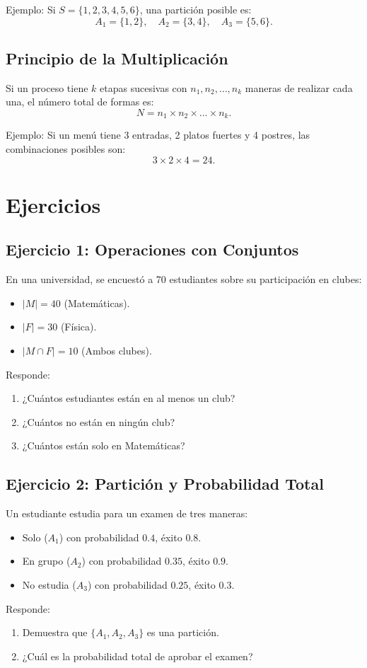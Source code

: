 \documentclass{article}
\begin{document}
	Ejemplo: Si $S = \{1,2,3,4,5,6\}$, una partición posible es:
	\[ A_1 = \{1,2\}, \quad A_2 = \{3,4\}, \quad A_3 = \{5,6\}. \]
	
	\subsection{Principio de la Multiplicación}
	Si un proceso tiene $k$ etapas sucesivas con $n_1, n_2, \dots, n_k$ maneras de realizar cada una, el número total de formas es:
	\[ N = n_1 \times n_2 \times \dots \times n_k. \]
	
	Ejemplo: Si un menú tiene 3 entradas, 2 platos fuertes y 4 postres, las combinaciones posibles son:
	\[ 3 \times 2 \times 4 = 24. \]
	
	\section{Ejercicios}
	
	\subsection{Ejercicio 1: Operaciones con Conjuntos}
	En una universidad, se encuestó a 70 estudiantes sobre su participación en clubes:
	\begin{itemize}
		\item $|M| = 40$ (Matemáticas).
		\item $|F| = 30$ (Física).
		\item $|M \cap F| = 10$ (Ambos clubes).
	\end{itemize}
	Responde:
	\begin{enumerate}
		\item ¿Cuántos estudiantes están en al menos un club?
		\item ¿Cuántos no están en ningún club?
		\item ¿Cuántos están solo en Matemáticas?
	\end{enumerate}
	
	\subsection{Ejercicio 2: Partición y Probabilidad Total}
	Un estudiante estudia para un examen de tres maneras:
	\begin{itemize}
		\item Solo ($A_1$) con probabilidad $0.4$, éxito $0.8$.
		\item En grupo ($A_2$) con probabilidad $0.35$, éxito $0.9$.
		\item No estudia ($A_3$) con probabilidad $0.25$, éxito $0.3$.
	\end{itemize}
	Responde:
	\begin{enumerate}
		\item Demuestra que $\{A_1, A_2, A_3\}$ es una partición.
		\item ¿Cuál es la probabilidad total de aprobar el examen?
	\end{enumerate}
	
\end{document}

